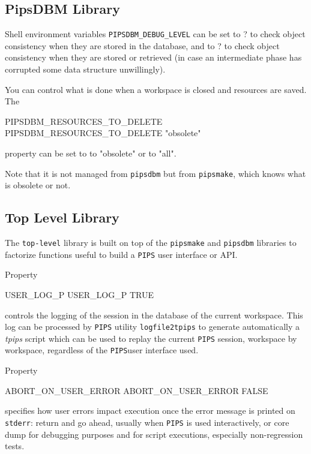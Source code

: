 \documentclass[a4paper]{report}
\newcommand{\Pips}{\texttt{PIPS}}
\newcommand{\Tpips}{{\em tpips}}
\begin{document}
\subsection{PipsDBM Library}

Shell environment variables \verb+PIPSDBM_DEBUG_LEVEL+ can be set to ?
to check object consistency when they are stored in the database, and to
? to check object consistency when they are stored or retrieved (in case
an intermediate phase has corrupted some data structure unwillingly).

You can control what is done when a workspace is closed and resources are
saved. The
\begin{PipsProp}{PIPSDBM_RESOURCES_TO_DELETE}
PIPSDBM_RESOURCES_TO_DELETE "obsolete"
\end{PipsProp}
property can be set to to "obsolete" or to "all".

Note that it is not managed from {\tt pipsdbm} but from {\tt pipsmake},
which knows what is obsolete or not.



\subsection{Top Level Library}

The \verb/top-level/ library is built on top of the \verb/pipsmake/
and \verb/pipsdbm/ libraries to factorize functions useful to build a
\Pips{} user interface or API.

Property
\begin{PipsProp}{USER_LOG_P}
USER_LOG_P TRUE
\end{PipsProp}
controls the logging of the session in the database of the current
workspace. This log can be processed by \Pips{} utility \verb/logfile2tpips/
to generate automatically a \Tpips{} script which can be used to
replay the current \Pips{} session, workspace by workspace, regardless
of the \Pips user interface used.

Property
\begin{PipsProp}{ABORT_ON_USER_ERROR}
ABORT_ON_USER_ERROR FALSE
\end{PipsProp}
specifies how user errors impact execution once the error message is
printed on \verb/stderr/: return and go ahead, usually when \Pips{} is
used interactively, or core dump for debugging purposes and for script
executions, especially non-regression tests.
\end{document}
